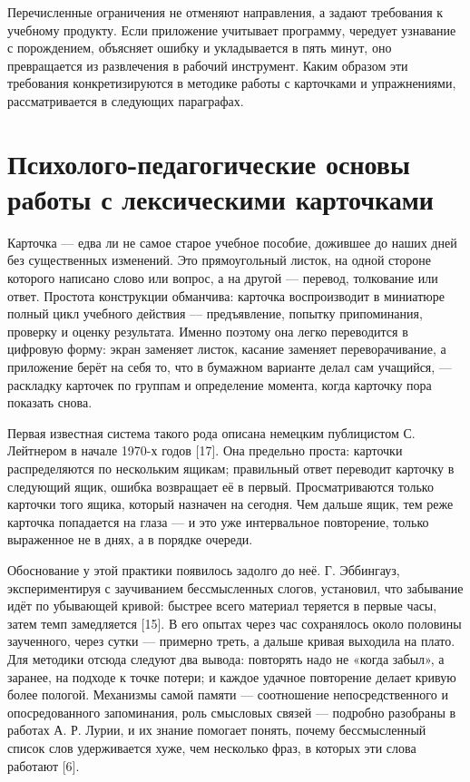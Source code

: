 \documentclass[11pt,a4paper,openany]{report}
\begin{document}
Перечисленные ограничения не отменяют направления, а задают требования к учебному продукту. Если приложение учитывает программу, чередует узнавание с порождением, объясняет ошибку и укладывается в пять минут, оно превращается из развлечения в рабочий инструмент. Каким образом эти требования конкретизируются в методике работы с карточками и упражнениями, рассматривается в следующих параграфах.

\section{Психолого-педагогические основы работы с лексическими карточками}

Карточка — едва ли не самое старое учебное пособие, дожившее до наших дней без существенных изменений. Это прямоугольный листок, на одной стороне которого написано слово или вопрос, а на другой — перевод, толкование или ответ. Простота конструкции обманчива: карточка воспроизводит в миниатюре полный цикл учебного действия — предъявление, попытку припоминания, проверку и оценку результата. Именно поэтому она легко переводится в цифровую форму: экран заменяет листок, касание заменяет переворачивание, а приложение берёт на себя то, что в бумажном варианте делал сам учащийся, — раскладку карточек по группам и определение момента, когда карточку пора показать снова.

Первая известная система такого рода описана немецким публицистом С. Лейтнером в начале 1970-х годов [17]. Она предельно проста: карточки распределяются по нескольким ящикам; правильный ответ переводит карточку в следующий ящик, ошибка возвращает её в первый. Просматриваются только карточки того ящика, который назначен на сегодня. Чем дальше ящик, тем реже карточка попадается на глаза — и это уже интервальное повторение, только выраженное не в днях, а в порядке очереди.

Обоснование у этой практики появилось задолго до неё. Г. Эббингауз, экспериментируя с заучиванием бессмысленных слогов, установил, что забывание идёт по убывающей кривой: быстрее всего материал теряется в первые часы, затем темп замедляется [15]. В его опытах через час сохранялось около половины заученного, через сутки — примерно треть, а дальше кривая выходила на плато. Для методики отсюда следуют два вывода: повторять надо не «когда забыл», а заранее, на подходе к точке потери; и каждое удачное повторение делает кривую более пологой. Механизмы самой памяти — соотношение непосредственного и опосредованного запоминания, роль смысловых связей — подробно разобраны в работах А. Р. Лурии, и их знание помогает понять, почему бессмысленный список слов удерживается хуже, чем несколько фраз, в которых эти слова работают [6].
\end{document}
